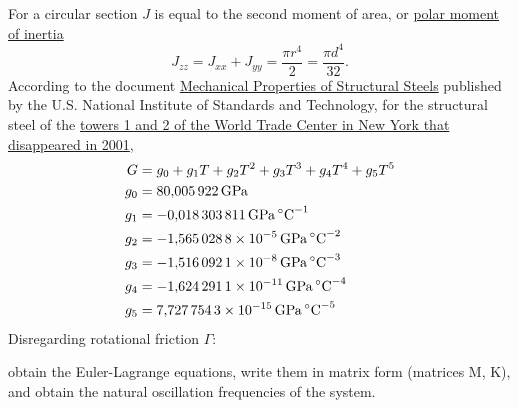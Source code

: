 \documentclass[11pt, english, a4paper, twopage]{article}
\begin{document}
\begin{enumerate}
For a circular section \(J\) is equal to the second moment of area, or \href{https://en.wikipedia.org/wiki/Second_moment_of_area}{polar moment of inertia}
\[
 J_{zz} = J_{xx} + J_{yy} = \frac{\pi r^4}{2} = \frac{\pi d^4}{32}.
\]
According to the document \href{https://tsapps.nist.gov/publication/get_pdf.cfm?pub_id=101021}{Mechanical Properties of Structural Steels} published by the U.S. National Institute of Standards and Technology, for the structural steel of the \href{https://en.wikipedia.org/wiki/World_Trade_Center_(1973%E2%80%932001)}{towers 1 and 2 of the World Trade Center in New York that disappeared in 2001},
\[
 \begin{aligned}
 G &= g_0 + g_1 T + g_2 T^2 + g_3 T^3 + g_4 T^4 + g_5 T^5\\
 g_0 &= \SI{80.005922}{\giga\pascal}\\
 g_1 &= \SI{-0.018303811}{\giga\pascal\per\celsius}\\
 g_2 &= \SI{-1.5650288E-5}{\giga\pascal\per\celsius\tothe{2}}\\
 g_3 &= \SI{-1.5160921E-8}{\giga\pascal\per\celsius\tothe{3}}\\
 g_4 &= \SI{-1.6242911E-11}{\giga\pascal\per\celsius\tothe{4}}\\
 g_5 &= \SI{7.7277543E-15}{\giga\pascal\per\celsius\tothe{5}}
 \end{aligned}
\]
Disregarding rotational friction \(\Gamma\):
\begin{tasks}
 \task obtain the Euler-Lagrange equations,
 \task write them in matrix form (matrices M, K), and
 \task obtain the natural oscillation frequencies of the system.
\end{tasks}
\end{enumerate}
\end{document}
